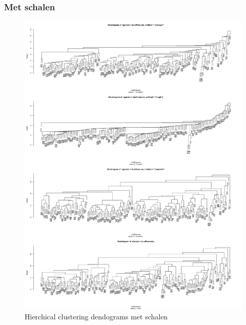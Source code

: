 \documentclass[a4paper,kulak]{kulakarticle}
\begin{document}
\subsubsection{Met schalen}
\begin{figure}[H]
	\centering
	\includegraphics[height=\textheight]{figures/hierachicalClusteringScaledDendogram.jpg}
	\caption{Hierchical clustering dendograms met schalen}
	\label{fig:hcd}
\end{figure}
\end{document}
